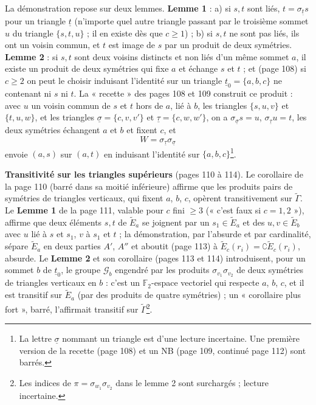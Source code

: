 \documentclass[11pt,a4paper]{article}
\begin{document}
La démonstration repose sur deux lemmes. \textbf{Lemme 1} : a) si $s, t$ sont
liés, $t = \sigma_{\underline t} s$ pour un triangle $\underline t$ (n'importe
quel autre triangle passant par le troisième sommet $u$ du triangle $\lbrace s,
t, u\rbrace$ ; il en existe dès que $c \geq 1$) ; b) si $s, t$ ne sont pas liés,
ils ont un voisin commun, et $t$ est image de $s$ par un produit de deux
symétries. \textbf{Lemme 2} : si $s, t$ sont deux voisins distincts et non liés d'un
même sommet $a$, il existe un produit de deux symétries qui fixe $a$ et échange
$s$ et $t$ ; et (page 108) si $c \geq 2$ on peut le choisir induisant
l'identité sur un triangle $\underline t_0 = \lbrace a, b, c\rbrace$ ne contenant ni
$s$ ni $t$. La « recette » des pages 108 et 109 construit ce produit : avec $u$ un
voisin commun de $s$ et $t$ hors de $a$, lié à $b$, les triangles $\lbrace s, u,
v\rbrace$ et $\lbrace t, u, w\rbrace$, et les triangles $\underline\sigma = \lbrace c, v,
v'\rbrace$ et $\underline\tau = \lbrace c, w, w'\rbrace$, on a $\sigma_{\underline\sigma}
s = u$, $\sigma_{\underline\tau} u = t$, les deux symétries échangent $a$ et $b$
et fixent $c$, et
\[
W = \sigma_{\underline\tau} \sigma_{\underline\sigma}
\]
envoie $(a, s)$ sur $(a, t)$ en induisant l'identité sur $\lbrace a, b,
c\rbrace$\footnote{La lettre $\underline\sigma$ nommant un triangle est d'une
lecture incertaine. Une première version de la recette (page 108) et un NB
(page 109, continué page 112) sont barrés.}.

\textbf{Transitivité sur les triangles supérieurs} (pages 110 à 114). Le
corollaire de la page 110 (barré dans sa moitié inférieure) affirme que les
produits pairs de symétries de triangles verticaux, qui fixent $a$, $b$, $c$,
opèrent transitivement sur $\widetilde\Gamma$. Le \textbf{Lemme 1} de la page 111,
valable pour $c$ fini $\geq 3$ (« c'est faux si $c = 1, 2$ »), affirme que deux
éléments $s, t$ de $\widetilde E_a$ se joignent par un $s_1 \in \widetilde E_a$ et
des $u, v \in \widetilde E_b$ avec $u$ lié à $s$ et $s_1$, $v$ à $s_1$ et $t$ ;
la démonstration, par l'absurde et par cardinalité, sépare $\widetilde E_a$ en
deux parties $A'$, $A''$ et aboutit (page 113) à $\widetilde E_c(r_i) =
\complement\widetilde E_c(r_i)$, absurde. Le \textbf{Lemme 2} et son corollaire
(pages 113 et 114) introduisent, pour un sommet $b$ de $\underline t_0$, le groupe
$\mathcal{G}_b$ engendré par les produits $\sigma_{v_1}\sigma_{v_2}$ de deux
symétries de triangles verticaux en $b$ : c'est un $\mathbb{F}_2$-espace vectoriel
qui respecte $a$, $b$, $c$, et il est transitif sur $\widetilde E_a$ (par des
produits de quatre symétries) ; un « corollaire plus fort », barré, l'affirmait
transitif sur $\widetilde\Gamma$\footnote{Les indices de $\pi =
\sigma_{w_1}\sigma_{v_2}$ dans le lemme 2 sont surchargés ; lecture incertaine.}.
\end{document}
